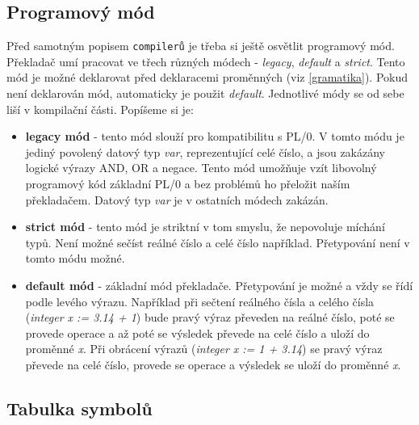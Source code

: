\documentclass[
12pt,
a4paper,
pdftex,
czech,
titlepage
]{report}
\begin{document}
\subsection{Programový mód}   \label{programMode}
  Před samotným popisem \texttt{compilerů} je třeba si ještě osvětlit programový mód. Překladač umí pracovat ve třech různých módech - \textit{legacy}, \textit{default} a \textit{strict}. Tento mód je možné deklarovat před deklaracemi proměnných (viz \ref{gramatika}). Pokud není deklarován mód, automaticky je použit \textit{default}.
  Jednotlivé módy se od sebe liší v kompilační části. Popíšeme si je:
  \begin{itemize}
  \item \textbf{legacy mód} - tento mód slouží pro kompatibilitu s PL/0. V tomto módu je jediný povolený datový typ \textit{var}, reprezentující celé číslo,  a jsou zakázány logické výrazy AND, OR a negace. Tento mód umožňuje vzít libovolný programový kód základní PL/0 a bez problémů ho přeložit naším překladačem. Datový typ \textit{var} je v ostatních módech zakázán.
  \item \textbf{strict mód} - tento mód je striktní v tom smyslu, že nepovoluje míchání typů. Není možné sečíst reálné číslo a celé číslo například. Přetypování není v tomto módu možné.
  \item \textbf{default mód} - základní mód překladače. Přetypování je možné a vždy se řídí podle levého výrazu. Například při sečtení reálného čísla a celého čísla (\textit{integer x := 3.14 + 1}) bude pravý výraz převeden na reálné číslo, poté se provede operace a až poté se výsledek převede na celé číslo a uloží do proměnné \textit{x}. Při obrácení výrazů (\textit{integer x := 1 + 3.14}) se pravý výraz převede na celé číslo, provede se operace a výsledek se uloží do proměnné \textit{x}. 
  \end{itemize}
  
  \subsection{Tabulka symbolů}
  
\end{document}
